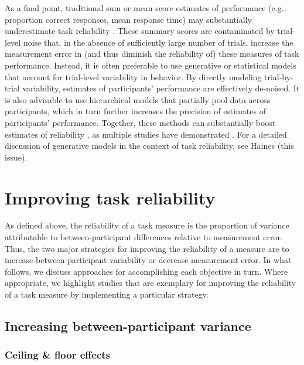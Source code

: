 \documentclass[a4paper,12pt]{article}
\begin{document}
As a final point, traditional sum or mean score estimates of performance (e.g., proportion correct responses, mean response time) may substantially underestimate task reliability \cite{Rouder2019-am, haines2020learning}. These summary scores are contaminated by trial-level noise that, in the absence of sufficiently large number of trials, increase the measurement error in (and thus diminish the reliability of) these measures of task performance. Instead, it is often preferable to use generative or statistical models that account for trial-level variability in behavior. By directly modeling trial-by-trial variability, estimates of participants' performance are effectively de-noised. It is also advisable to use hierarchical models that partially pool data across participants, which in turn further increases the precision of estimates of participants' performance. Together, these methods can substantially boost estimates of reliability \cite{Rouder2019-am, haines2020learning}, as multiple studies have demonstrated  \cite{snijder2022psychometric, sullivan2022enhancing, brown2020improving, waltmann2022sufficient}. For a detailed discussion of generative models in the context of task reliability, see Haines (this issue).

\section{Improving task reliability}

As defined above, the reliability of a task measure is the proportion of variance attributable to between-participant differences relative to measurement error. Thus, the two major strategies for improving the reliability of a measure are to increase between-participant variability or decrease measurement error. In what follows, we discuss approaches for accomplishing each objective in turn. Where appropriate, we highlight studies that are exemplary for improving the reliability of a task measure by implementing a particular strategy. 

\subsection{Increasing between-participant variance}

\subsubsection{Ceiling \& floor effects}
\end{document}
